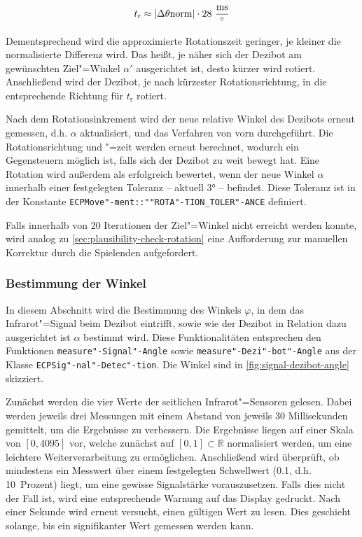 {\begin{equation*}
    t_{\text{r}} \approx \vert\Delta\theta{\text{norm}}\vert \cdot 28~\frac{\text{ms}}{^\circ}
\end{equation*}

Dementsprechend wird die approximierte Rotationszeit geringer, je kleiner die normalisierte Differenz wird. Das heißt, je näher sich der Dezibot am gewünschten Ziel"=Winkel $\alpha'$ ausgerichtet ist, desto kürzer wird rotiert. Anschließend wird der Dezibot, je nach kürzester Rotationsrichtung, in die entsprechende Richtung für $t_{\text{r}}$ rotiert.

Nach dem Rotationsinkrement wird der neue relative Winkel des Dezibots erneut gemessen, d.h. $\alpha$ aktualisiert, und das Verfahren von vorn durchgeführt. Die Rotationsrichtung und "=zeit werden erneut berechnet, wodurch ein Gegensteuern möglich ist, falls sich der Dezibot zu weit bewegt hat. Eine Rotation wird außerdem als erfolgreich bewertet, wenn der neue Winkel $\alpha$ innerhalb einer festgelegten Toleranz -- aktuell 3° -- befindet. Diese Toleranz ist in der Konstante \texttt{ECPMove"-ment::""ROTA"-TION\_TOLER"-ANCE} definiert.

Falls innerhalb von 20 Iterationen der Ziel"=Winkel nicht erreicht werden konnte, wird analog zu \autoref{sec:plausibility-check-rotation} eine Aufforderung zur manuellen Korrektur durch die Spielenden aufgefordert.


\subsubsection{Bestimmung der Winkel}
\label{sec:angle-determination}

In diesem Abschnitt wird die Bestimmung des Winkels $\varphi$, in dem das Infrarot"=Signal beim Dezibot eintrifft, sowie wie der Dezibot in Relation dazu ausgerichtet ist $\alpha$ bestimmt wird. Diese Funktionalitäten entsprechen den Funktionen \texttt{measure"-Signal"-Angle} sowie \texttt{measure"-Dezi"-bot"-Angle} aus der Klasse \texttt{ECPSig"-nal"-Detec"-tion}. Die Winkel sind in \autoref{fig:signal-dezibot-angle} skizziert.
 
Zunächst werden die vier Werte der seitlichen Infrarot"=Sensoren gelesen. Dabei werden jeweils drei Messungen mit einem Abstand von jeweils 30 Millisekunden gemittelt, um die Ergebnisse zu verbessern. Die Ergebnisse liegen auf einer Skala von $[0,4095]$ vor, welche zunächst auf $[0,1] \subset \mathbb{R}$ normalisiert werden, um eine leichtere Weiterverarbeitung zu ermöglichen. Anschließend wird überprüft, ob mindestens ein Messwert über einem festgelegten Schwellwert (0.1, d.h. 10~Prozent) liegt, um eine gewisse Signalstärke vorauszusetzen. Falls dies nicht der Fall ist, wird eine entsprechende Warnung auf das Display gedruckt. Nach einer Sekunde wird erneut versucht, einen gültigen Wert zu lesen. Dies geschieht solange, bis ein signifikanter Wert gemessen werden kann.

}
